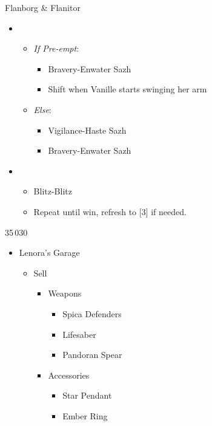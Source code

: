\begin{multicols}{2}
\begin{battle}{Flanborg \& Flanitor}
\begin{itemize}

    \item \first
    \begin{itemize}
    \item \textit{If Pre-empt}:
        \begin{itemize}
            \item Bravery-Enwater Sazh
            \item Shift when Vanille starts swinging her arm
        \end{itemize}
    \item \textit{Else}:
        \begin{itemize}
            \item Vigilance-Haste Sazh
            \item Bravery-Enwater Sazh
        \end{itemize}    
    \end{itemize}
    \item \sixth
    \begin{itemize}
        \item Blitz-Blitz
        \item Repeat until win, refresh to [3] if needed.
    \end{itemize}
\end{itemize}
 
\end{battle}
\vfill
\begin{shop}{35\,030}
\begin{itemize}
    \item Lenora's Garage
    \begin{itemize}
        \item Sell
        \begin{itemize}
            \item Weapons
            \begin{itemize}
                \item Spica Defenders
                \item Lifesaber
                \item Pandoran Spear
            \end{itemize}
            \item Accessories
            \begin{itemize}
                \item Star Pendant
                \item Ember Ring

\end{itemize}
\end{itemize}
\end{itemize}
\end{itemize}
\end{shop}
\end{multicols}
